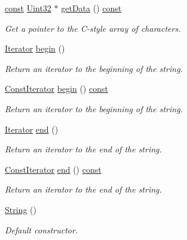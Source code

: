 \begin{DoxyCompactItemize}
\hyperlink{term__entry_8h_a57bd63ce7f9a353488880e3de6692d5a}{const} \hyperlink{namespacesf_aa746fb1ddef4410bddf198ebb27e727c}{Uint32} $\ast$ \hyperlink{classsf_1_1_string_af2d4e70869ebd38e225c6796e1325ae4}{get\-Data} () \hyperlink{term__entry_8h_a57bd63ce7f9a353488880e3de6692d5a}{const} 
\begin{DoxyCompactList}\small\item\em Get a pointer to the C-\/style array of characters. \end{DoxyCompactList}\item 
\hyperlink{classsf_1_1_string_ac90f2b7b28f703020f8d027e98806235}{Iterator} \hyperlink{classsf_1_1_string_a8ec30ddc08e3a6bd11c99aed782f6dfe}{begin} ()
\begin{DoxyCompactList}\small\item\em Return an iterator to the beginning of the string. \end{DoxyCompactList}\item 
\hyperlink{classsf_1_1_string_a8e18efc2e8464f6eb82818902d527efa}{Const\-Iterator} \hyperlink{classsf_1_1_string_a09bbf7704847ed35bf1c18aca6fba2a2}{begin} () \hyperlink{term__entry_8h_a57bd63ce7f9a353488880e3de6692d5a}{const} 
\begin{DoxyCompactList}\small\item\em Return an iterator to the beginning of the string. \end{DoxyCompactList}\item 
\hyperlink{classsf_1_1_string_ac90f2b7b28f703020f8d027e98806235}{Iterator} \hyperlink{classsf_1_1_string_ac823012f39cb6f61100418876e99d53b}{end} ()
\begin{DoxyCompactList}\small\item\em Return an iterator to the end of the string. \end{DoxyCompactList}\item 
\hyperlink{classsf_1_1_string_a8e18efc2e8464f6eb82818902d527efa}{Const\-Iterator} \hyperlink{classsf_1_1_string_ab6fb6ee1b21bd5dbdc9d6840f035eb79}{end} () \hyperlink{term__entry_8h_a57bd63ce7f9a353488880e3de6692d5a}{const} 
\begin{DoxyCompactList}\small\item\em Return an iterator to the end of the string. \end{DoxyCompactList}\item 
\hyperlink{classsf_1_1_string_a9563a4e93f692e0c8e8702b374ef8692}{String} ()
\begin{DoxyCompactList}\small\item\em Default constructor. \end{DoxyCompactList}\item 

\end{DoxyCompactItemize}
